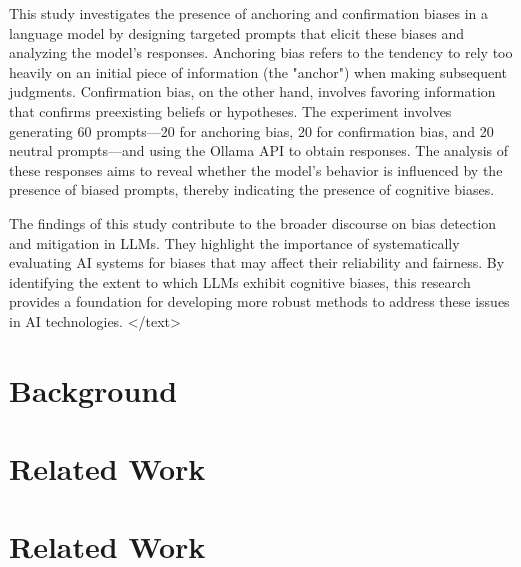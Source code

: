 \documentclass{article}
\begin{document}
This study investigates the presence of anchoring and confirmation biases in a language model by designing targeted prompts that elicit these biases and analyzing the model's responses. Anchoring bias refers to the tendency to rely too heavily on an initial piece of information (the "anchor") when making subsequent judgments. Confirmation bias, on the other hand, involves favoring information that confirms preexisting beliefs or hypotheses. The experiment involves generating 60 prompts—20 for anchoring bias, 20 for confirmation bias, and 20 neutral prompts—and using the Ollama API to obtain responses. The analysis of these responses aims to reveal whether the model's behavior is influenced by the presence of biased prompts, thereby indicating the presence of cognitive biases.

The findings of this study contribute to the broader discourse on bias detection and mitigation in LLMs. They highlight the importance of systematically evaluating AI systems for biases that may affect their reliability and fairness. By identifying the extent to which LLMs exhibit cognitive biases, this research provides a foundation for developing more robust methods to address these issues in AI technologies.
</text>
\section{Background}

\section{Related Work}
\section*{Related Work}
\end{document}
